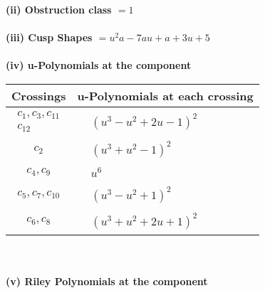 \documentclass[1p]{elsarticle_modified}
\theoremstyle{definition}
\begin{document}
\flushleft \textbf{(ii) Obstruction class $= 1$}\\~\\
\flushleft \textbf{(iii) Cusp Shapes $= u^2 a-7 a u+a+3 u+5$}\\~\\
\newpage\renewcommand{\arraystretch}{1}
\flushleft \textbf{(iv) u-Polynomials at the component}\newline \\
\begin{tabular}{m{50pt}|m{274pt}}
Crossings & \hspace{64pt}u-Polynomials at each crossing \\
\hline $$\begin{aligned}c_{1},c_{3},c_{11}\\c_{12}\end{aligned}$$&$\begin{aligned}
&(u^3- u^2+2 u-1)^2
\end{aligned}$\\
\hline $$\begin{aligned}c_{2}\end{aligned}$$&$\begin{aligned}
&(u^3+u^2-1)^2
\end{aligned}$\\
\hline $$\begin{aligned}c_{4},c_{9}\end{aligned}$$&$\begin{aligned}
&u^6
\end{aligned}$\\
\hline $$\begin{aligned}c_{5},c_{7},c_{10}\end{aligned}$$&$\begin{aligned}
&(u^3- u^2+1)^2
\end{aligned}$\\
\hline $$\begin{aligned}c_{6},c_{8}\end{aligned}$$&$\begin{aligned}
&(u^3+u^2+2 u+1)^2
\end{aligned}$\\
\hline
\end{tabular}\\~\\
\newpage\renewcommand{\arraystretch}{1}
\flushleft \textbf{(v) Riley Polynomials at the component}\newline \\
\end{document}
